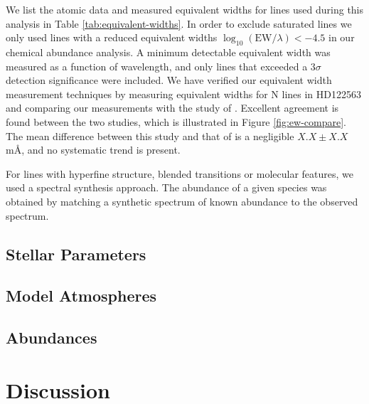 \documentclass{emulateapj}
\begin{document}
We list the atomic data and measured equivalent widths for lines used during this analysis in Table \ref{tab:equivalent-widths}. In order to exclude saturated lines we only used lines with a reduced equivalent widths $\log_{10}{(\mbox{EW}/\lambda)} < -4.5$ in our chemical abundance analysis. A minimum detectable equivalent width was measured as a function of wavelength, and only lines that exceeded a $3\sigma$ detection significance were included. We have verified our equivalent width measurement techniques by measuring equivalent widths for N lines in HD122563 and comparing our measurements with the study of \citet{Norris;et-al_2000}. Excellent agreement is found between the two studies, which is illustrated in Figure \ref{fig:ew-compare}. The mean difference between this study and that of \cite{Norris;et-al_2000} is a negligible $X.X \pm X.X$\,m\AA{}, and no systematic trend is present.

For lines with hyperfine structure, blended transitions or molecular features, we used a spectral synthesis approach. The abundance of a given species was obtained by matching a synthetic spectrum of known abundance to the observed spectrum.

\subsection{Stellar Parameters}

\subsection{Model Atmospheres}

\subsection{Abundances}

\section{Discussion}
\end{document}
